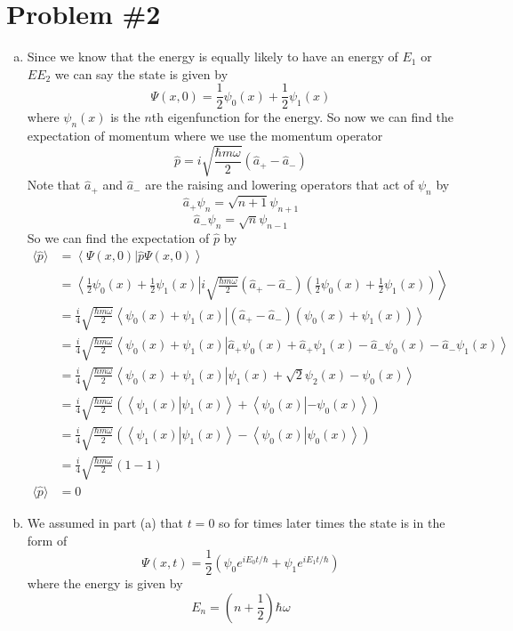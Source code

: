 \documentclass[11pt]{article}
\numberwithin{equation}{section}
\newcommand{\expt}[1]{\langle{#1}\rangle}
\newcommand{\norm}[2]{\left\langle{#1}\right|\left.{#2}\right\rangle}
\begin{document}
\section{Problem \#2}
\begin{enumerate}[(a)]
\item
Since we know that the energy is equally likely to have an energy of $E_1$ or $EE_2$ we can say the state is given by
$$\Psi(x,0) = \frac{1}{2}\psi_0(x)+\frac{1}{2}\psi_1(x)$$
where $\psi_n(x)$ is the $n$th eigenfunction for the energy. So now we can find the expectation of momentum where we use the momentum operator
$$\hat{p} = i\sqrt{\frac{\hbar m\omega}{2}}(\hat{a}_+-\hat{a}_-)$$
Note that $\hat{a}_+$ and $\hat{a}_-$ are the raising and lowering operators that act of $\psi_n$ by 
\begin{equation}
\hat{a}_+\psi_n = \sqrt{n+1}\psi_{n+1}
\label{Raise}
\end{equation}
\begin{equation}
\hat{a}_-\psi_n = \sqrt{n}\psi_{n-1}
\label{Raise}
\end{equation}
So we can find the expectation of $\hat{p}$ by 
\begin{align*}
\expt{\hat{p}} &= \norm{\Psi(x,0)}{\hat{p}\Psi(x,0)}\\
&= \norm{\frac{1}{2}\psi_0(x)+\frac{1}{2}\psi_1(x)}{i\sqrt{\frac{\hbar m\omega}{2}}(\hat{a}_+-\hat{a}_-)\left(\frac{1}{2}\psi_0(x)+\frac{1}{2}\psi_1(x)\right)}\\
&= \frac{i}{4}\sqrt{\frac{\hbar m\omega}{2}}\norm{\psi_0(x)+\psi_1(x)}{(\hat{a}_+-\hat{a}_-)\left(\psi_0(x)+\psi_1(x)\right)}\\
&= \frac{i}{4}\sqrt{\frac{\hbar m\omega}{2}}\norm{\psi_0(x)+\psi_1(x)}{\hat{a}_+\psi_0(x)+\hat{a}_+\psi_1(x)-\hat{a}_-\psi_0(x)-\hat{a}_-\psi_1(x)}\\
&= \frac{i}{4}\sqrt{\frac{\hbar m\omega}{2}}\norm{\psi_0(x)+\psi_1(x)}{\psi_1(x)+\sqrt{2}\psi_2(x)-\psi_0(x)}\\
&= \frac{i}{4}\sqrt{\frac{\hbar m\omega}{2}}\left(\norm{\psi_1(x)}{\psi_1(x)}+\norm{\psi_0(x)}{-\psi_0(x)}\right)\\
&= \frac{i}{4}\sqrt{\frac{\hbar m\omega}{2}}\left(\norm{\psi_1(x)}{\psi_1(x)}-\norm{\psi_0(x)}{\psi_0(x)}\right)\\
&= \frac{i}{4}\sqrt{\frac{\hbar m\omega}{2}}(1-1)\\
\expt{\hat{p}} &=0
\end{align*}

\item
We assumed in part (a) that $t=0$ so for times later times the state is in the form of
$$\Psi(x,t) = \frac{1}{2}\left(\psi_0e^{iE_0t/\hbar}+\psi_1e^{iE_1t/\hbar}\right)$$
where the energy is given by 
$$E_n = \left(n+\frac{1}{2}\right)\hbar\omega$$
\end{enumerate}
\end{document}
